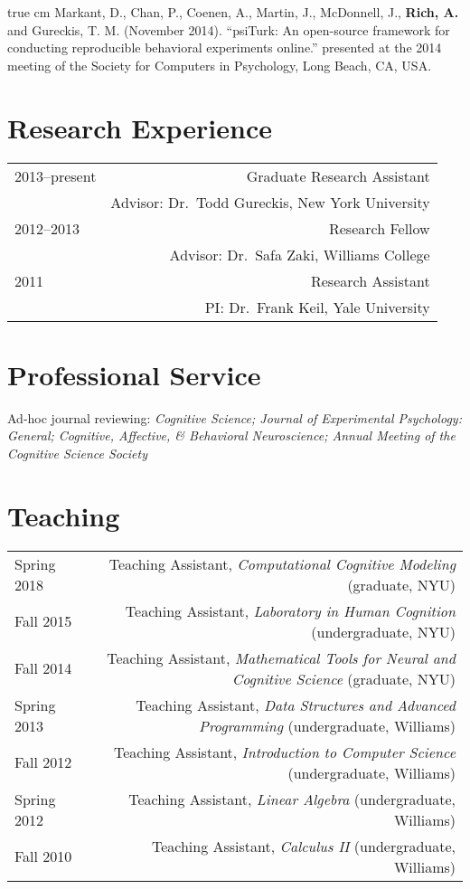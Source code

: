 \documentclass[12pt]{my_cv}
\def\ind{\hangindent=1 true cm\hangafter=1 \noindent}
\begin{document}
\ind Markant, D., Chan, P., Coenen, A., Martin, J., McDonnell, J., \textbf{Rich,
  A.} and Gureckis, T. M. (November 2014). ``psiTurk: An open-source framework
for conducting reproducible behavioral experiments online.'' presented at
the 2014 meeting of the Society for Computers in Psychology, Long Beach, CA,
USA.

\section{Research Experience}
\begin{tabular}{L R}
2013--present& Graduate Research Assistant\\
&Advisor: Dr.\ Todd Gureckis, New York University\\[1ex]
2012--2013& Research Fellow\\
&Advisor: Dr.\ Safa Zaki, Williams College\\[1ex]
2011&Research Assistant\\
&PI: Dr.\ Frank Keil, Yale University\\
\end{tabular}

\section{Professional Service}

Ad-hoc journal reviewing: \emph{Cognitive Science; Journal of Experimental
  Psychology: General; Cognitive, Affective, \& Behavioral Neuroscience;
  Annual Meeting of the Cognitive Science Society}

\section{Teaching}
\begin{tabular}{L R}
Spring 2018 & Teaching Assistant, \emph{Computational Cognitive Modeling} (graduate, NYU)\\ [0.5ex]
Fall 2015 & Teaching Assistant, \emph{Laboratory in Human Cognition} (undergraduate, NYU)\\ [0.5ex]
Fall 2014&Teaching Assistant, \emph{Mathematical Tools for Neural and Cognitive Science} (graduate, NYU)\\ [0.5ex]
Spring 2013&Teaching Assistant, \emph{Data Structures and Advanced Programming} (undergraduate, Williams)\\[0.5ex]
Fall 2012&Teaching Assistant, \emph{Introduction to Computer Science} (undergraduate, Williams)\\[0.5ex]
Spring 2012&Teaching Assistant, \emph{Linear Algebra} (undergraduate, Williams)\\[0.5ex]
Fall 2010&Teaching Assistant, \emph{Calculus II} (undergraduate, Williams)\\[0.5ex]
\end{tabular}
\end{document}
